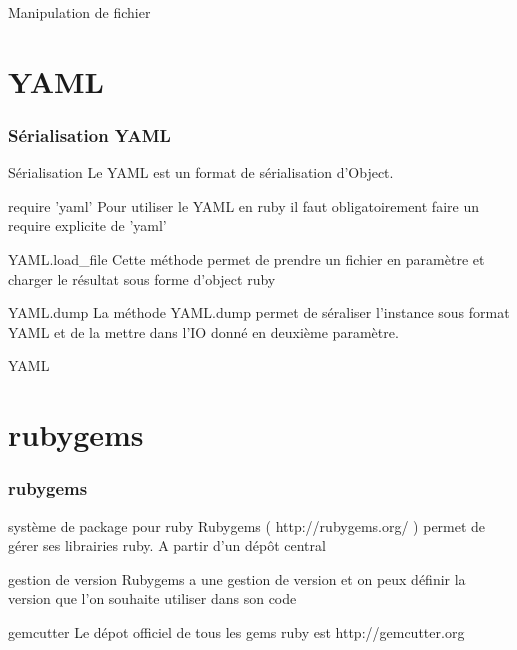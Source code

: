 \documentclass{beamer}
\begin{document}
\begin{frame}
  \begin{beamerboxesrounded}{Manipulation de fichier}
    
  \end{beamerboxesrounded}
\end{frame}

\section{YAML}

\begin{frame}
  \frametitle{S\'erialisation YAML}
  \begin{block}{S\'erialisation}
    Le YAML est un format de s\'erialisation d'Object.
  \end{block}
  \begin{block}{require 'yaml'}
    Pour utiliser le YAML en ruby il faut obligatoirement
    faire un require explicite de 'yaml'
  \end{block}
  \begin{block}{YAML.load\_file}
    Cette m\'ethode permet de prendre un fichier en paramètre
    et charger le r\'esultat sous forme d'object ruby
  \end{block}
  \begin{block}{YAML.dump}
    La m\'ethode YAML.dump permet de s\'eraliser l'instance
    sous format YAML et de la mettre dans l'IO donn\'e en
    deuxième paramètre.
  \end{block}
\end{frame}

\begin{frame}
  \begin{beamerboxesrounded}{YAML}
    
  \end{beamerboxesrounded}
\end{frame}


\section{rubygems}

\begin{frame}
  \frametitle{rubygems}
  \begin{block}{système de package pour ruby}
    Rubygems ( http://rubygems.org/ ) permet de g\'erer
    ses librairies ruby. A partir d'un d\'epôt central
  \end{block}
  \begin{block}{gestion de version}
    Rubygems a une gestion de version et on peux d\'efinir la
    version que l'on souhaite utiliser dans son code
  \end{block}
  \begin{block}{gemcutter}
    Le d\'epot officiel de tous les gems ruby est http://gemcutter.org
  \end{block}
\end{frame}
\end{document}
